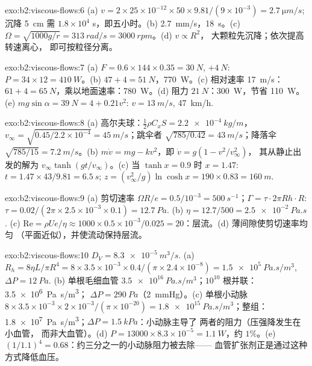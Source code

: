 \begin{solution}{exo:b2:viscous-flows:6}
(a) $v = 2 \times 25 \times 10^{-12} \times 50 \times 9.81/(9 \times 10^{-3}) = \qty{2.7}{\micro m/s}$;
沉降 \qty{5}{cm} 需 $1.8 \times 10^4$ s，即五小时。(b) \qty{2.7}{mm/s}，\qty{18}{s}。(c)
$\Omega = \sqrt{1000g/r} = \qty{313}{rad/s} = \qty{3000}{rpm}$。(d) $v \propto R^2$，
大颗粒先沉降；依次提高转速离心，
即可按粒径分离。
\end{solution}

\begin{solution}{exo:b2:viscous-flows:7}
(a) $F = 0.6 \times 144 \times 0.35 = \qty{30}{N}$, $+\qty{4}{N}$: $P = 34 \times 12 =
\qty{410}{W}$。(b) $47 + 4 = \qty{51}{N}$，\qty{770}{W}。(c) 相对速率
\qty{17}{m/s}：$61 + 4 = \qty{65}{N}$，乘以地面速率：\qty{780}{W}。(d)
阻力 $\qty{21}{N}$：\qty{300}{W}，节省 \qty{110}{W}。(e) $mg\sin\alpha = \qty{39}{N} =
4 + 0.21v^2$: $v = \qty{13}{m/s}$, \qty{47}{km/h}.
\end{solution}

\begin{solution}{exo:b2:viscous-flows:8}
(a) 高尔夫球：$\tfrac12\rho C_xS = \qty{2.2e-4}{kg/m}$，$v_\infty = \sqrt{0.45/2.2 \times 10^{-4}}
= \qty{45}{m/s}$；跳伞者 $\sqrt{785/0.42} = \qty{43}{m/s}$；降落伞 $\sqrt{785/15} =
\qty{7.2}{m/s}$。(b) $m\dot v = mg - kv^2$，即 $\dot v = g(1 - v^2/v_\infty^2)$，
其从静止出发的解为 $v_\infty\tanh(gt/v_\infty)$。(c) 当 $\tanh x = 0.9$ 时
$x = 1.47$: $t = 1.47 \times 43/9.81 = \qty{6.5}{s}$; $z = (v_\infty^2/g)\ln\cosh x =
190 \times 0.83 = \qty{160}{m}$.
\end{solution}

\begin{solution}{exo:b2:viscous-flows:9}
(a) 剪切速率 $\Omega R/e = 0.5/10^{-3} = \qty{500}{s^{-1}}$；$\Gamma = \tau\cdot2\pi Rh
\cdot R$: $\tau = 0.02/(2\pi \times 2.5 \times 10^{-3} \times 0.1) = \qty{12.7}{Pa}$. (b) $\eta
= 12.7/500 = \qty{2.5e-2}{Pa.s}$. (c) $\mathrm{Re} = \rho Ue/\eta \approx 1000 \times 0.5 \times
10^{-3}/0.025 = 20$：层流。(d) 薄间隙使剪切速率均匀
（平面近似），并使流动保持层流。
\end{solution}

\begin{solution}{exo:b2:viscous-flows:10}
$D_V = \qty{8.3e-5}{m^3/s}$. (a) $R_h = 8\eta L/\pi R^4 = 8 \times 3.5 \times 10^{-3} \times
0.4/(\pi \times 2.4 \times 10^{-8}) = \qty{1.5e5}{Pa.s/m^3}$, $\Delta P = \qty{12}{Pa}$. (b)
单根毛细血管 $\qty{3.5e16}{Pa.s/m^3}$；$10^{10}$ 根并联：\qty{3.5e6}{Pa.s/m^3}；
$\Delta P = \qty{290}{Pa}$（\qty{2}{mmHg}）。(c) 单根小动脉 $8 \times 3.5 \times 10^{-3}
\times 2 \times 10^{-3}/(\pi \times 10^{-20}) = \qty{1.8e15}{Pa.s/m^3}$；整组：
\qty{1.8e7}{Pa.s/m^3}；$\Delta P = \qty{1.5}{kPa}$：小动脉主导了
两者的阻力（压强降发生在小血管，
而非大血管）。(d) $P = 13000 \times 8.3 \times 10^{-5} = \qty{1.1}{W}$，约 $1\%$。(e)
$(1/1.1)^4 = 0.68$：约三分之一的小动脉阻力被去除——
血管扩张剂正是通过这种方式降低血压。
\end{solution}


